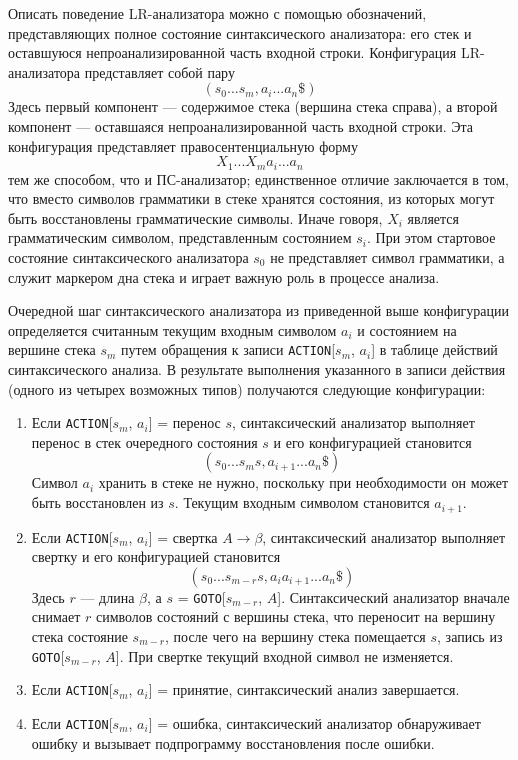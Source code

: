 \documentclass[bachelor, och, coursework, times]{SCWorks}
\begin{document}
Описать поведение LR-анализатора можно с помощью обозначений, представляющих полное состояние синтаксического анализатора: его стек и оставшуюся непроанализированной часть входной строки. Конфигурация \linebreak 
LR-анализатора представляет собой пару 
\[
	(s_0...s_m, a_i...a_n\$) 
\]
Здесь первый компонент --- содержимое стека (вершина стека справа), а второй 
компонент --- оставшаяся непроанализированной часть входной строки. Эта  
конфигурация представляет правосентенциальную форму 
\[
	X_1...X_ma_i...a_n
\]
тем же способом, что и ПС-анализатор; единственное отличие заключается в том, что вместо символов грамматики в стеке хранятся состояния, из которых могут быть восстановлены грамматические символы. Иначе говоря, $X_i$ является грамматическим символом, представленным состоянием $s_i$. При этом стартовое состояние синтаксического анализатора $s_0$ не представляет символ грамматики, а служит маркером дна стека и играет важную роль в процессе анализа. 


Очередной шаг синтаксического анализатора из приведенной выше конфигурации определяется считанным текущим входным символом $a_i$ и состоянием на вершине стека $s_m$ путем обращения к записи \verb|ACTION|[$s_m$, $a_i$] в таблице действий синтаксического анализа. В результате выполнения указанного в записи действия (одного из четырех возможных типов) получаются следующие конфигурации:
\begin{enumerate}
	\item Если \verb|ACTION|[$s_m$, $a_i$] = перенос $s$, синтаксический анализатор выполняет перенос в стек очередного состояния $s$ и его конфигурацией становится 
	\[
			(s_0...s_ms, a_{i+1}...a_n\$) 
	\]
	Символ $a_i$ хранить в стеке не нужно, поскольку при необходимости он может быть восстановлен из $s$. Текущим входным символом становится $a_{i+1}$.
	\item Если \verb|ACTION|[$s_m$, $a_i$] = свертка $A \to \beta$, синтаксический анализатор выполняет свертку и его конфигурацией становится 
	\[
			(s_0...s_{m-r}s, a_ia_{i+1}...a_n\$) 
	\]
	Здесь $r$ --- длина $\beta$, а $s$ = \verb|GOTO|[$s_{m-r}$, $A$]. Синтаксический анализатор вначале снимает $r$ символов состояний с вершины стека, что переносит на вершину стека состояние $s_{m-r}$, после чего на вершину стека помещается $s$, запись из \verb|GOTO|[$s_{m-r}$, $A$]. При свертке текущий входной символ не изменяется. 
	\item Если \verb|ACTION|[$s_m$, $a_i$] = принятие, синтаксический анализ завершается. 
	\item Если \verb|ACTION|[$s_m$, $a_i$] = ошибка, синтаксический анализатор обнаруживает ошибку и вызывает подпрограмму восстановления после ошибки. 
\end{enumerate}
\end{document}
